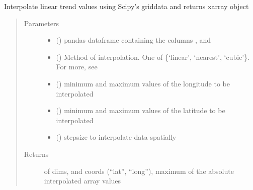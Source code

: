 \documentclass[letterpaper,10pt,english]{sphinxmanual}
\begin{document}
\begin{fulllineitems}
\label{\detokenize{modules/plot_linear_trend:dtwhaclustering.plot_linear_trend.compute_interpolation}}
\sphinxAtStartPar
Interpolate linear trend values using Scipy’s griddata and returns xarray object
\begin{quote}\begin{description}
\item[{Parameters}] \leavevmode\begin{itemize}
\item {} 
\sphinxAtStartPar
{} () \textendash{} pandas dataframe containing the columns ,  and 

\item {} 
\sphinxAtStartPar
{} () \textendash{} Method of interpolation. One of \{‘linear’, ‘nearest’, ‘cubic’\}. For more, see 

\item {} 
\sphinxAtStartPar
{} () \textendash{} minimum and maximum values of the longitude to be interpolated

\item {} 
\sphinxAtStartPar
{} () \textendash{} minimum and maximum values of the latitude to be interpolated

\item {} 
\sphinxAtStartPar
{} () \textendash{} stepsize to interpolate data spatially

\end{itemize}

\item[{Returns}] \leavevmode
\sphinxAtStartPar
{} of dims, and coords (“lat”, “long”), maximum of the absolute interpolated array values

\end{description}\end{quote}

\end{fulllineitems}
\end{document}
